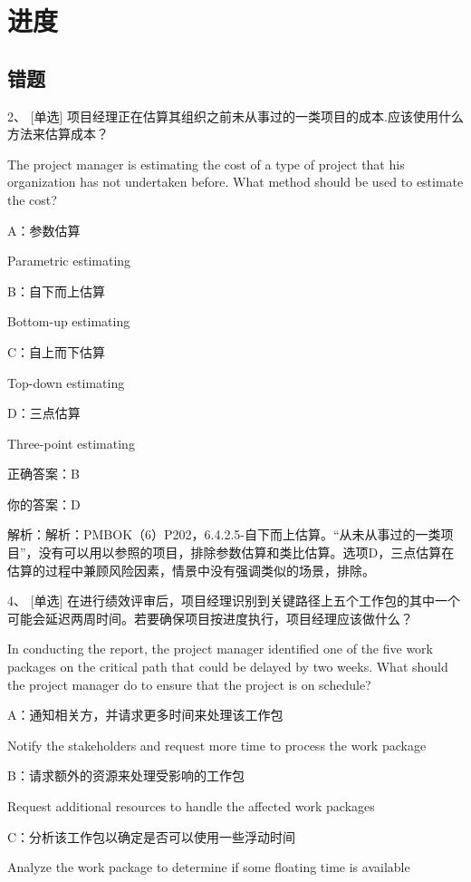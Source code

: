 
\chapter{进度}

\section{错题}

2、 [单选] 项目经理正在估算其组织之前未从事过的一类项目的成本.应该使用什么方法来估算成本？

The project manager is estimating the cost of a type of project that his organization has not undertaken before. What method should be used to estimate the cost?

A：参数估算

Parametric estimating

B：自下而上估算

Bottom-up estimating

C：自上而下估算

Top-down estimating

D：三点估算

Three-point estimating

正确答案：B

你的答案：D

解析：解析：PMBOK（6）P202，6.4.2.5-自下而上估算。“从未从事过的一类项目”，没有可以用以参照的项目，排除参数估算和类比估算。选项D，三点估算在估算的过程中兼顾风险因素，情景中没有强调类似的场景，排除。



4、 [单选] 在进行绩效评审后，项目经理识别到关键路径上五个工作包的其中一个可能会延迟两周时间。若要确保项目按进度执行，项目经理应该做什么？

In conducting the report, the project manager identified one of the five work packages on the critical path that could be delayed by two weeks. What should the project manager do to ensure that the project is on schedule?

A：通知相关方，并请求更多时间来处理该工作包

Notify the stakeholders and request more time to process the work package

B：请求额外的资源来处理受影响的工作包

Request additional resources to handle the affected work packages

C：分析该工作包以确定是否可以使用一些浮动时间

Analyze the work package to determine if some floating time is available

